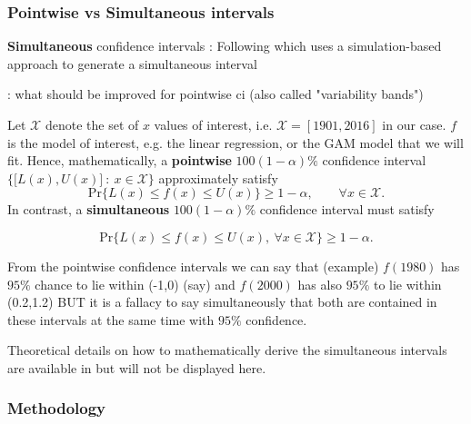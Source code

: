 \subsubsection*{Pointwise vs Simultaneous intervals}

\textbf{Simultaneous} confidence intervals :  Following \citet[section 4.9, section 6.5]{ruppert_semiparametric_2003} which uses a simulation-based approach to generate a simultaneous interval
\citet{marra_coverage_2012}

\citet[p.135]{ruppert_semiparametric_2003} : what should be improved for pointwise ci (also called "variability bands")

Let $\mathcal{X}$ denote the set of $x$ values of interest, i.e. $\mathcal{X}=[1901,2016]$ in our case. $f$ is the model of interest, e.g. the linear regression, or the GAM model that we will fit. Hence, mathematically, a \textbf{pointwise} $100(1-\alpha)\%$ confidence interval $\Big\{\big[L(x),U(x)\big] \ : \ x\in \mathcal{X}\Big\}$ approximately satisfy 
\begin{equation}
\text{Pr}\Big\{L(x)\leq f(x)\leq U(x)\Big\}\geq 1-\alpha, \qquad \forall x\in\mathcal{X}.
\end{equation}
In contrast, a \textbf{simultaneous} $100(1-\alpha)\%$ confidence interval must satisfy 

\begin{equation}
\text{Pr}\Big\{L(x)\leq f(x)\leq U(x), \ \forall x\in\mathcal{X}\Big\}\geq 1-\alpha.
\end{equation}

From the pointwise confidence intervals we can say that (example) $f(1980)$ has $95\%$ chance to lie within (-1,0) (say) and $f(2000)$ has also $95\%$ to lie within (0.2,1.2) BUT it is a fallacy to say simultaneously that both are contained in these intervals at the same time with $95\%$ confidence. \citet[section 6.5]{ruppert_semiparametric_2003}

Theoretical details on how to mathematically derive the simultaneous intervals are available in \citet[pp.142-144]{ruppert_semiparametric_2003} but will not be displayed here.

\subsubsection*{Methodology}

